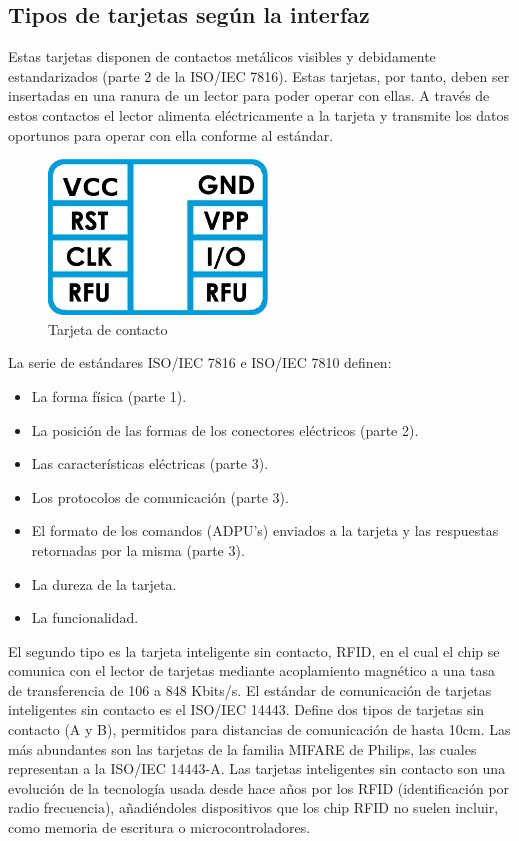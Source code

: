 \subsection{Tipos de tarjetas según la interfaz}

\bigskip
{}

Estas tarjetas disponen de contactos metálicos visibles y debidamente estandarizados (parte 2 de la ISO/IEC 7816). Estas tarjetas, por tanto, deben ser insertadas en una ranura de un lector para poder operar con ellas. A través de estos contactos el lector alimenta eléctricamente a la tarjeta y transmite los datos oportunos para operar con ella conforme al estándar.

\begin{figure}[H]
\centering
  \begin{center}
  \includegraphics[scale=.3]{Imagenes/sc1.jpg} 
  \end{center}
  \caption{Tarjeta de contacto}\label{Fig:HW} 
\end{figure}

La serie de estándares ISO/IEC 7816 e ISO/IEC 7810 definen:

\begin{itemize}
\item La forma física (parte 1). 
\item La posición de las formas de los conectores eléctricos (parte 2). 
\item Las características eléctricas (parte 3). 
\item Los protocolos de comunicación (parte 3).
\item El formato de los comandos (ADPU's) enviados a la tarjeta y las respuestas retornadas por la misma (parte 3).
\item La dureza de la tarjeta.
\item La funcionalidad.
\end{itemize}


\bigskip
{}

El segundo tipo es la tarjeta inteligente sin contacto, RFID,  en el cual el chip se comunica con el lector de tarjetas mediante acoplamiento magnético a una tasa de transferencia de 106 a 848 Kbits/s.
El estándar de comunicación de tarjetas inteligentes sin contacto es el ISO/IEC 14443. Define dos tipos de tarjetas sin contacto (A y B), permitidos para distancias de comunicación de hasta 10cm. Las más abundantes son las tarjetas de la familia MIFARE de Philips, las cuales representan a la ISO/IEC 14443-A.
Las tarjetas inteligentes sin contacto son una evolución de la tecnología usada desde hace años por los RFID (identificación por radio frecuencia), añadiéndoles dispositivos que los chip RFID no suelen incluir, como memoria de escritura o microcontroladores.

